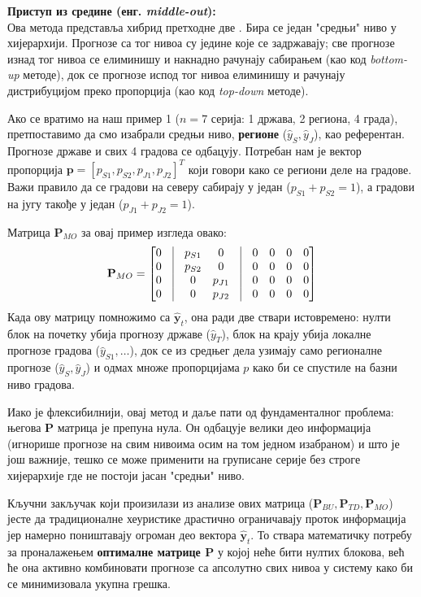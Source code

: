 \documentclass[12pt,oneside]{memoir}
\begin{document}
\vspace{1em}
\noindent \textbf{Приступ из средине (енг. \textit{middle-out}):} \\
Ова метода представља хибрид претходне две \cite{hyndman2021forecasting}. Бира се један "средњи" ниво у хијерархији. Прогнозе са тог нивоа су једине које се задржавају; све прогнозе изнад тог нивоа се елиминишу и накнадно рачунају сабирањем (као код \textit{bottom-up} методе), док се прогнозе испод тог нивоа елиминишу и рачунају дистрибуцијом преко пропорција (као код \textit{top-down} методе). 

Ако се вратимо на наш пример 1 ($n=7$ серија: 1 држава, 2 региона, 4 града), претпоставимо да смо изабрали средњи ниво, \textbf{регионе} ($\hat{y}_S, \hat{y}_J$), као референтан. Прогнозе државе и свих 4 градова се одбацују. Потребан нам је вектор пропорција $\mathbf{p} = [p_{S1}, p_{S2}, p_{J1}, p_{J2}]^T$ који говори како се региони деле на градове. Важи правило да се градови на северу сабирају у један ($p_{S1} + p_{S2} = 1$), а градови на југу такође у један ($p_{J1} + p_{J2} = 1$). 

Матрица $\mathbf{P}_{MO}$ за овај пример изгледа овако:
\begin{equation}
    \mathbf{P}_{MO} = 
    \begin{bmatrix}
    0 & \vline & p_{S1} & 0 & \vline & 0 & 0 & 0 & 0 \\
    0 & \vline & p_{S2} & 0 & \vline & 0 & 0 & 0 & 0 \\
    0 & \vline & 0 & p_{J1} & \vline & 0 & 0 & 0 & 0 \\
    0 & \vline & 0 & p_{J2} & \vline & 0 & 0 & 0 & 0
    \end{bmatrix}
\end{equation}
Када ову матрицу помножимо са $\hat{\mathbf{y}}_t$, она ради две ствари истовремено: нулти блок на почетку убија прогнозу државе ($\hat{y}_T$), блок на крају убија локалне прогнозе градова ($\hat{y}_{S1}, \dots$), док се из средњег дела узимају само регионалне прогнозе ($\hat{y}_S, \hat{y}_J$) и одмах множе пропорцијама $p$ како би се спустиле на базни ниво градова. 

Иако је флексибилнији, овај метод и даље пати од фундаменталног проблема: његова $\mathbf{P}$ матрица је препуна нула. Он одбацује велики део информација (игнорише прогнозе на свим нивоима осим на том једном изабраном) и што је још важније, тешко се може  применити на груписане серије без строге хијерархије где не постоји јасан "средњи" ниво.

\vspace{1em}
Кључни закључак који произилази из анализе ових матрица ($\mathbf{P}_{BU}, \mathbf{P}_{TD}, \mathbf{P}_{MO}$) јесте да традиционалне хеуристике драстично ограничавају проток информација јер намерно поништавају огроман део вектора $\hat{\mathbf{y}}_t$. То ствара математичку потребу за проналажењем \textbf{оптималне матрице $\mathbf{P}$} у којој неће бити нултих блокова, већ ће она активно комбиновати прогнозе са апсолутно свих нивоа у систему како би се минимизовала укупна грешка.
\end{document}
